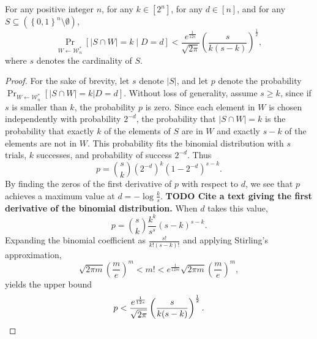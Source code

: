 \documentclass{article}
\newcommand{\todo}[1]{\textbf{TODO #1}}
\newcommand{\mc}{\mathcal}
\begin{document}
\begin{lemma}\label{lem:prob}
  For any positive integer $n$, for any $k \in [2^n]$, for any $d \in [n]$, and for any $S \subseteq \left(\left\{0, 1\right\}^n \setminus \emptyset\right)$,
  \begin{equation*}
    \Pr_{W \gets \mc{W}_n^*}\left[ |S \cap W| = k \middle| D = d\right] < \frac{e^{\frac{1}{12s}}}{\sqrt{2 \pi}} \left(\frac{s}{k (s - k)}\right)^{\frac{1}{2}},
  \end{equation*}
  where $s$ denotes the cardinality of $S$.
\end{lemma}
\begin{proof}
  For the sake of brevity, let $s$ denote $|S|$, and let $p$ denote the probability $\Pr_{W \gets \mc{W}_n^*}[ |S \cap W| = k | D = d]$.
  Without loss of generality, assume $s \geq k$, since if $s$ is smaller than $k$, the probability $p$ is zero.
  Since each element in $W$ is chosen independently with probability $2^{-d}$, the probability that $|S \cap W| = k$ is the probability that exactly $k$ of the elements of $S$ are in $W$ and exactly $s - k$ of the elements are not in $W$.
  This probability fits the binomial distribution with $s$ trials, $k$ successes, and probability of success $2^{-d}$.
  Thus
  \begin{equation*}
    p = \binom{s}{k} (2^{-d})^k (1 - 2^{-d})^{s - k}.
  \end{equation*}
  By finding the zeros of the first derivative of $p$ with respect to $d$, we see that $p$ achieves a maximum value at $d = -\log \frac{k}{s}$.
  \todo{Cite a text giving the first derivative of the binomial distribution.}
  When $d$ takes this value,
  \begin{equation*}
    p = \binom{s}{k} \frac{k^k}{s^s} (s - k)^{s - k}.  %
  \end{equation*}
  Expanding the binomial coefficient as $\frac{s!}{k!(s - k)!}$ and applying Stirling's approximation,
  \begin{equation*}
    \sqrt{2 \pi m} \left(\frac{m}{e}\right)^m < m! < e^{\frac{1}{12m}} \sqrt{2 \pi m} \left(\frac{m}{e}\right)^m,
  \end{equation*}
  yields the upper bound
  \begin{equation*}
    p < \frac{e^{\frac{1}{12s}}}{\sqrt{2 \pi}} \left(\frac{s}{k (s - k)}\right)^{\frac{1}{2}}. \qedhere
  \end{equation*}
\end{proof}
\end{document}
